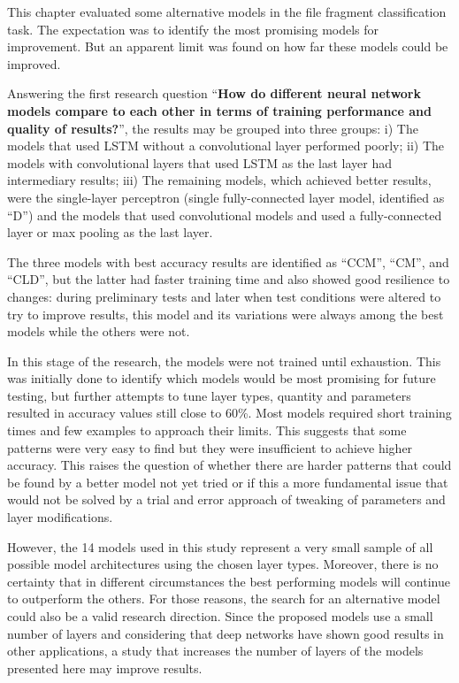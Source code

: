 This chapter evaluated some alternative models in the file fragment classification task. The expectation was to identify the most promising models for improvement. But an apparent limit was found on how far these models could be improved.

{\color{red}
Answering the first research question ``\textbf{How do different neural network models compare to each other in terms of training performance and quality of results?}'', 
the results may be grouped into three groups: i) The models that used LSTM without a convolutional layer performed poorly; ii) The models with convolutional layers that used LSTM as the last layer had intermediary results; iii) The remaining models, which achieved better results, were the single-layer perceptron (single fully-connected layer model, identified as ``D'') and the models that used convolutional models and used a fully-connected layer or max pooling as the last layer.
}

The three models with best accuracy results are identified as ``CCM'', ``CM'', and ``CLD'', but the latter had faster training time and also showed good resilience to changes: during preliminary tests and later when test conditions were altered to try to improve results, this model and its variations were always among the best models while the others were not.

In this stage of the research, the models were not trained until exhaustion.
This was initially done to identify which models would be most promising for future testing, but further attempts to tune layer types, quantity and parameters resulted in accuracy values still close to 60\%.
Most models required short training times and few examples to approach their limits.
This suggests that some patterns were very easy to find but they were insufficient to achieve higher accuracy.
This raises the question of whether there are harder patterns that could be found by a better model not yet tried or if this a more fundamental issue that would not be solved by a trial and error approach of tweaking of parameters and layer modifications.


However, the 14 models used in this study represent a very small sample of all possible model architectures using the chosen layer types. Moreover, there is no certainty that in different circumstances the best performing models will continue to outperform the others. For those reasons, the search for an alternative model could also be a valid research direction. Since the proposed models use a small number of layers and considering that deep networks have shown good results in other applications, a study that increases the number of layers of the models presented here may improve results.

